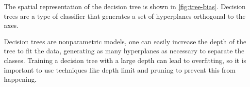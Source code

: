 The spatial representation of the decision tree is shown in \cref{fig:tree-bias}.
Decision trees are a type of classifier that generates a set of hyperplanes orthogonal to the axes.

Decision trees are nonparametric models, one can easily increase the depth of the tree to
fit the data, generating as many hyperplanes as necessary to separate the classes.
Training a decision tree with a large depth can lead to overfitting, so it is important to
use techniques like depth limit and pruning to prevent this from happening.

%
%
%
%

